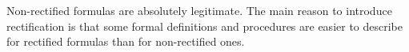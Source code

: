 

\setcounter{section}{1}
\setcounter{subsection}{2}
\setcounter{dfn}{7}

\begin{rem}
Non-rectified formulas are absolutely legitimate.
The main reason to introduce rectification is that
some formal definitions and procedures are easier to describe for rectified formulas than for non-rectified ones.
\end{rem}

